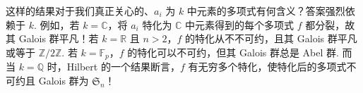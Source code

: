 \begin{remark*}这样的结果对于我们真正关心的、$a_i$ 为 $k$ 中元素的多项式有何含义？答案强烈依赖于 $k$. 例如，若 $k=\mathbb C$，将 $a_i$ 特化为 $\mathbb C$ 中元素得到的每个多项式 $f$ 都分裂，故其 Galois 群平凡！若 $k=\mathbb R$ 且 $n>2$，$f$ 的特化从不不可约，且其 Galois 群平凡或等于 $\mathbb Z/2\mathbb Z$. 若 $k=\mathbb F_p$，$f$ 的特化可以不可约，但其 Galois 群总是 Abel 群. 而当 $k=\mathbb Q$ 时，Hilbert 的一个结果断言，$f$ 有无穷多个特化，使特化后的多项式不可约且 Galois 群为 $\mathfrak S_n$！\end{remark*}

